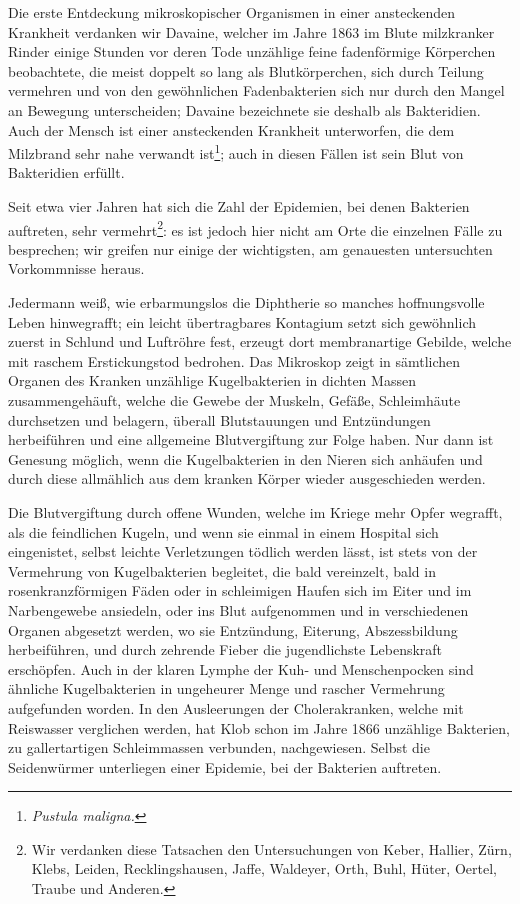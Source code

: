 \documentclass[a4paper, 11pt, oneside, english]{article}
\begin{document}
Die erste Entdeckung mikroskopischer Organismen in einer ansteckenden Krankheit verdanken wir Davaine, welcher im Jahre 1863 im Blute milzkranker Rinder einige Stunden vor deren Tode unzählige feine fadenförmige Körperchen beobachtete, die meist doppelt so lang als Blutkörperchen, sich durch Teilung vermehren und von den gewöhnlichen Fadenbakterien sich nur durch den Mangel an Bewegung unterscheiden; Davaine bezeichnete sie deshalb als Bakteridien. Auch der Mensch ist einer ansteckenden Krankheit unterworfen, die dem Milzbrand sehr nahe verwandt ist\footnote{\emph{Pustula maligna.}}; auch in diesen Fällen ist sein Blut von Bakteridien erfüllt.

Seit etwa vier Jahren hat sich die Zahl der Epidemien, bei denen Bakterien auftreten, sehr vermehrt\footnote{Wir verdanken diese Tatsachen den Untersuchungen von Keber, Hallier, Zürn, Klebs, Leiden, Recklingshausen, Jaffe, Waldeyer, Orth, Buhl, Hüter, Oertel, Traube und Anderen.}: es ist jedoch hier nicht am Orte die einzelnen Fälle zu besprechen; wir greifen nur einige der wichtigsten, am genauesten untersuchten Vorkommnisse heraus.

Jedermann weiß, wie erbarmungslos die Diphtherie so manches hoffnungsvolle Leben hinwegrafft; ein leicht übertragbares Kontagium setzt sich gewöhnlich zuerst in Schlund und Luftröhre fest, erzeugt dort membranartige Gebilde, welche mit raschem Erstickungstod bedrohen. Das Mikroskop zeigt in sämtlichen Organen des Kranken unzählige Kugelbakterien in dichten Massen zusammengehäuft, welche die Gewebe der Muskeln, Gefäße, Schleimhäute durchsetzen und belagern, überall Blutstauungen und Entzündungen herbeiführen und eine allgemeine Blutvergiftung zur Folge haben. Nur dann ist Genesung möglich, wenn die Kugelbakterien in den Nieren sich anhäufen und durch diese allmählich aus dem kranken Körper wieder ausgeschieden werden.

Die Blutvergiftung durch offene Wunden, welche im Kriege mehr Opfer wegrafft, als die feindlichen Kugeln, und wenn sie einmal in einem Hospital sich eingenistet, selbst leichte Verletzungen tödlich werden lässt, ist stets von der Vermehrung von Kugelbakterien begleitet, die bald vereinzelt, bald in rosenkranzförmigen Fäden oder in schleimigen Haufen sich im Eiter und im Narbengewebe ansiedeln, oder ins Blut aufgenommen und in verschiedenen Organen abgesetzt werden, wo sie Entzündung, Eiterung, Abszessbildung herbeiführen, und durch zehrende Fieber die jugendlichste Lebenskraft erschöpfen. Auch in der klaren Lymphe der Kuh- und Menschenpocken sind ähnliche Kugelbakterien in ungeheurer Menge und rascher Vermehrung aufgefunden worden. In den Ausleerungen der Cholerakranken, welche mit Reiswasser verglichen werden, hat Klob schon im Jahre 1866 unzählige Bakterien, zu gallertartigen Schleimmassen verbunden, nachgewiesen. Selbst die Seidenwürmer unterliegen einer Epidemie, bei der Bakterien auftreten.
\end{document}
